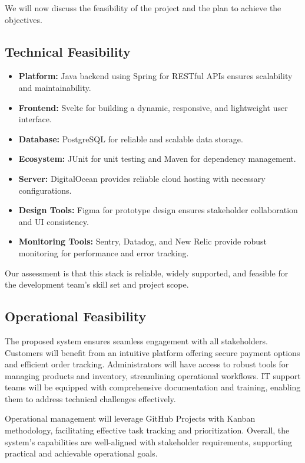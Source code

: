\documentclass[a4paper,journal]{IEEEtran}
\begin{document}
We will now discuss the feasibility of the project and the plan to achieve the
objectives.

\subsection{Technical Feasibility}
\begin{itemize}
  \item \textbf{Platform:} Java backend using Spring for RESTful APIs
    ensures scalability and maintainability.
  \item \textbf{Frontend:} Svelte for building a dynamic, responsive, and
    lightweight user interface.
  \item \textbf{Database:} PostgreSQL for reliable and scalable data storage.
  \item \textbf{Ecosystem:} JUnit for unit testing and Maven for dependency
    management.
  \item \textbf{Server:} DigitalOcean provides reliable cloud hosting with
    necessary configurations.
  \item \textbf{Design Tools:} Figma for prototype design ensures stakeholder
    collaboration and UI consistency.
  \item \textbf{Monitoring Tools:} Sentry, Datadog, and New Relic provide robust
    monitoring for performance and error tracking.
\end{itemize}

Our assessment is that this stack is reliable, widely supported, and feasible
for the development team's skill set and project scope.

\subsection{Operational Feasibility}
The proposed system ensures seamless engagement with all stakeholders.
Customers will benefit from an intuitive platform offering secure payment
options and efficient order tracking.
Administrators will have access to robust tools for managing products and
inventory, streamlining operational workflows.
IT support teams will be equipped with comprehensive documentation and training,
enabling them to address technical challenges effectively.

Operational management will leverage GitHub Projects with Kanban methodology,
facilitating effective task tracking and prioritization. Overall, the system's
capabilities are well-aligned with stakeholder requirements, supporting
practical and achievable operational goals.
\end{document}
